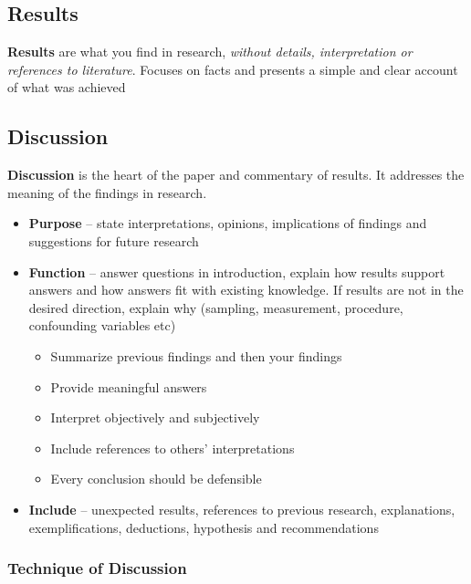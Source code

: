 \documentclass{article}
\begin{document}
\subsection{Results}

\textbf{Results} are what you find in research, \textit{without details, interpretation or references to literature}. Focuses on facts and presents a simple and clear account of what was achieved

\subsection{Discussion}

\textbf{Discussion} is the heart of the paper and commentary of results. It addresses the meaning of the findings in research.

\begin{itemize}
    \item \textbf{Purpose} -- state interpretations, opinions, implications of findings and suggestions for future research
    \item \textbf{Function} -- answer questions in introduction, explain how results support answers and how answers fit with existing knowledge. If results are not in the desired direction, explain why (sampling, measurement, procedure, confounding variables etc)
    \begin{itemize}
        \item Summarize previous findings and then your findings
        \item Provide meaningful answers
        \item Interpret objectively and subjectively
        \item Include references to others' interpretations
        \item Every conclusion should be defensible
    \end{itemize}
    \item \textbf{Include} -- unexpected results, references to previous research, explanations, exemplifications, deductions, hypothesis and recommendations
\end{itemize}

\subsubsection{Technique of Discussion}
\end{document}
